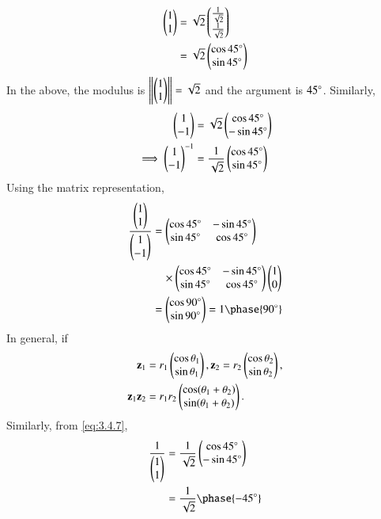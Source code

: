 \begin{align}
\begin{pmatrix}1\\1\end{pmatrix} &= \sqrt{2}\begin{pmatrix}\frac{1}{\sqrt{2}}\\ \frac{1}{\sqrt{2}}\end{pmatrix}
\\
&= \sqrt{2}\begin{pmatrix}\cos 45\degree \\ \sin 45\degree\end{pmatrix}
\label{eq:3.4.7}
\end{align}
In the above, the modulus is $\left\lVert\begin{pmatrix}1\\1\end{pmatrix}\right\rVert=\sqrt{2}$ and the argument is $45 \degree$.
Similarly, 
\begin{align}
\begin{pmatrix}1\\-1\end{pmatrix} &= \sqrt{2}\begin{pmatrix}\cos 45\degree \\ -\sin 45\degree\end{pmatrix}
\\
\implies \begin{pmatrix}1\\-1\end{pmatrix}^{-1} &= \frac{1}{\sqrt{2}}\begin{pmatrix}\cos 45\degree \\ \sin 45\degree\end{pmatrix}
\end{align}
Using the matrix representation, 
\begin{align}
\frac{\myvec{1\\1}}{\myvec{1\\-1}} &= \myvec{\cos45\degree&-\sin45\degree\\\sin45\degree&\cos45\degree}
\nonumber \\
&\quad \times  \myvec{\cos45\degree&-\sin45\degree\\\sin45\degree&\cos45\degree}
\myvec{1\\0}
\\
 &= \myvec{\cos 90\degree\\ \sin 90\degree}= 1 \phase{90\degree}\end{align}
%
In general, if
\begin{align}
\mathbf{z}_1 &= r_1\begin{pmatrix}\cos\theta_1\\\sin\theta_1\end{pmatrix}, \mathbf{z}_2 = r_2\begin{pmatrix}\cos\theta_2\\\sin\theta_2\end{pmatrix},
\\
\mathbf{z}_1\mathbf{z}_2 &= r_1r_2\begin{pmatrix}\cos(\theta_1+\theta_2)\\\sin(\theta_1+\theta_2)\end{pmatrix}.
\end{align}
Similarly, from \eqref{eq:3.4.7},
\begin{align}
\frac{1}{\myvec{1\\1}} &= \frac{1}{\sqrt{2}}\myvec{\cos 45\degree \\ -\sin 45\degree}
\\
&= \frac{1}{\sqrt{2}}\phase{-45\degree}
\end{align}
